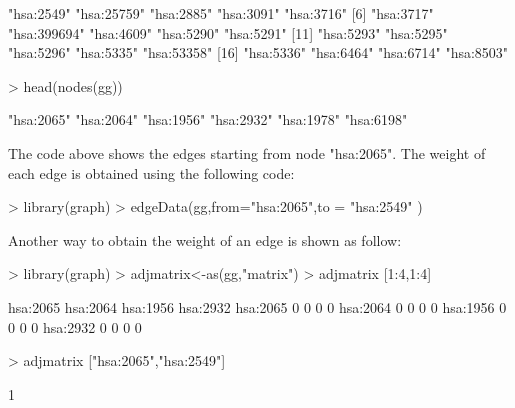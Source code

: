 \documentclass[11pt]{article}
\begin{document}
\begin{Schunk}
\begin{Soutput}
 [1] "hsa:2549"   "hsa:25759"  "hsa:2885"   "hsa:3091"   "hsa:3716"  
 [6] "hsa:3717"   "hsa:399694" "hsa:4609"   "hsa:5290"   "hsa:5291"  
[11] "hsa:5293"   "hsa:5295"   "hsa:5296"   "hsa:5335"   "hsa:53358" 
[16] "hsa:5336"   "hsa:6464"   "hsa:6714"   "hsa:8503"  
\end{Soutput}
\begin{Sinput}
> head(nodes(gg))
\end{Sinput}
\begin{Soutput}
[1] "hsa:2065" "hsa:2064" "hsa:1956" "hsa:2932" "hsa:1978" "hsa:6198"
\end{Soutput}
\end{Schunk}

The code above shows the edges starting
from node "hsa:2065". The weight of each
edge is obtained using the following code:

\begin{Schunk}
\begin{Sinput}
> library(graph)
> edgeData(gg,from="hsa:2065",to = "hsa:2549" )
\end{Sinput}
\end{Schunk}

Another way to obtain the weight of an edge
is shown as follow:

\begin{Schunk}
\begin{Sinput}
> library(graph)
> adjmatrix<-as(gg,"matrix")
> adjmatrix [1:4,1:4]
\end{Sinput}
\begin{Soutput}
         hsa:2065 hsa:2064 hsa:1956 hsa:2932
hsa:2065        0        0        0        0
hsa:2064        0        0        0        0
hsa:1956        0        0        0        0
hsa:2932        0        0        0        0
\end{Soutput}
\begin{Sinput}
> adjmatrix ["hsa:2065","hsa:2549"]
\end{Sinput}
\begin{Soutput}
[1] 1
\end{Soutput}
\end{Schunk}
\end{document}
